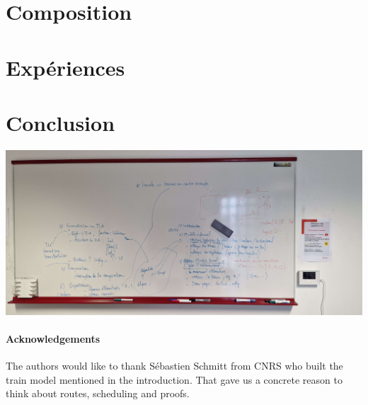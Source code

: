 \documentclass[runningheads]{llncs}
\begin{document}

\section{Composition}
\label{sec:composition}

\section{Expériences}
\label{sec:experiments}


\section{Conclusion}
\label{sec:conclusion}

\includegraphics[scale=0.1]{img/sommaire_tableau.jpg}

\paragraph{Acknowledgements} The authors would like to thank Sébastien Schmitt from CNRS who built the train model mentioned in the introduction. That gave us a concrete reason to think about routes, scheduling and proofs. 



\end{document}
